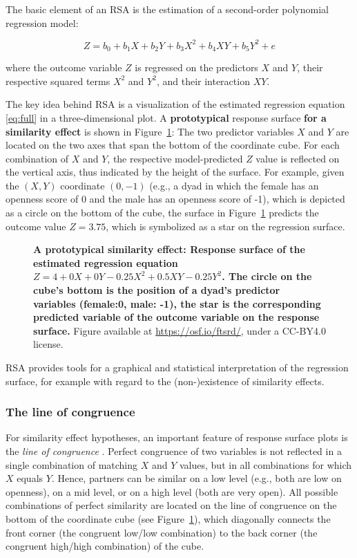 \documentclass[jou,a4paper,draftfirst]{apa6}
\newcommand{\added}[1]{\textcolor{colour_added}{\bf{#1}}}
\begin{document}
The basic element of an RSA is the estimation of a second-order polynomial regression model:

\begin{equation} 
\label{eq:full}
Z = b_0 + b_1 X + b_2 Y + b_3 X^2 + b_4 X Y + b_5 Y^2 + e
\end{equation}

where the outcome variable $Z$ is regressed on the predictors $X$ and $Y$, their respective squared terms $X^2$ and $Y^2$, and their interaction $XY$.

The key idea behind RSA is a visualization of the estimated regression equation \eqref{eq:full} in a three-dimensional plot. A \added{prototypical} response surface \added{for a similarity effect} is shown in Figure~\ref{fig:sqd}: The two predictor variables $X$ and $Y$ are located on the two axes that span the bottom of the coordinate cube. For each combination of $X$ and $Y$, the respective model-predicted $Z$ value is reflected on the vertical axis, thus indicated by the height of the surface. For example, given the $(X,Y)$ coordinate $(0,-1)$ (e.g., a dyad in which the female has an openness score of 0 and the male has an openness score of -1), which is depicted as a circle on the bottom of the cube, the surface in Figure~\ref{fig:sqd} predicts the outcome value $Z = 3.75$, which is symbolized as a star on the regression surface.


\begin{figure}[ht!]
\centering
{}
\caption{\added{A prototypical similarity effect: Response surface of the estimated regression equation $Z = 4 + 0X + 0Y - 0.25X^2 + 0.5XY - 0.25Y^2$. The circle on the cube's bottom is the position of a dyad's predictor variables (female:0, male: -1), the star is the corresponding predicted variable of the outcome variable on the response surface.} Figure available at \url{https://osf.io/ftsrd/}, under a CC-BY4.0 license.}
\label{fig:sqd}
\end{figure}

RSA provides tools for a graphical and statistical interpretation of the regression surface, for example with regard to the (non-)existence of similarity effects. 

\subsubsection{The line of congruence}
For similarity effect hypotheses, an important feature of response surface plots is the \textit{line of congruence} \parencite[LOC,][]{edwards_relationship_2007}. Perfect congruence of two variables is not reflected in a single combination of matching $X$ and $Y$ values, but in all combinations for which $X$ equals $Y$. Hence, partners can be similar on a low level (e.g., both are low on openness), on a mid level, or on a high level (both are very open). All possible combinations of perfect similarity are located on the line of congruence on the bottom of the coordinate cube (see Figure~\ref{fig:sqd}), which diagonally connects the front corner (the congruent low/low combination) to the back corner (the congruent high/high combination) of the cube.
\end{document}
